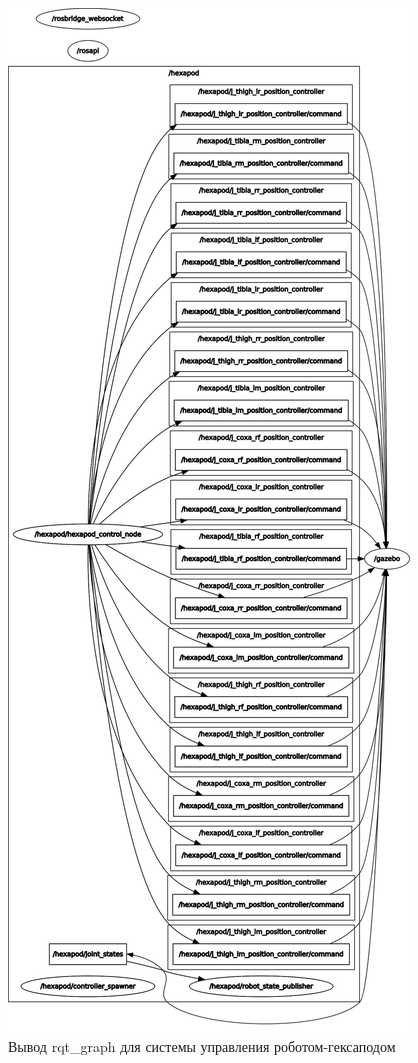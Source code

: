 \begin{figure}[]
	\centering
	\includegraphics[height = 0.9\textheight]{img/rqt}
	\caption{Вывод rqt\_graph для системы управления роботом-гексаподом}
	\label{img:rqt}
\end{figure}

